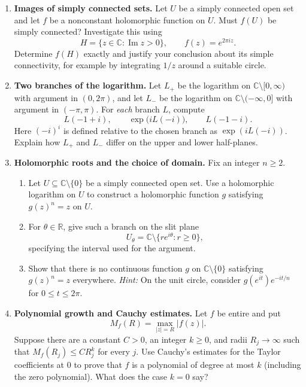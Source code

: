 \documentclass[12pt,reqno]{amsart}
\newcommand{\C}{\mathbb{C}}
\newcommand{\R}{\mathbb{R}}
\begin{document}
\begin{enumerate}
\item \textbf{Images of simply connected sets.}
Let $U$ be a simply connected open set and let $f$ be a nonconstant
holomorphic function on $U$. Must $f(U)$ be simply connected?
Investigate this using
\[
 H=\{z\in\C:\operatorname{Im}z>0\},\qquad f(z)=e^{2\pi i z}.
\]
Determine $f(H)$ exactly and justify your conclusion about its simple
connectivity, for example by integrating $1/z$ around a suitable circle.

\item \textbf{Two branches of the logarithm.}
Let $L_+$ be the logarithm on $\C\setminus[0,\infty)$ with argument
in $(0,2\pi)$, and let $L_-$ be the logarithm on
$\C\setminus(-\infty,0]$ with argument in $(-\pi,\pi)$.
For \emph{each} branch $L$, compute
\[
 L(-1+i),\qquad \exp\bigl(iL(-i)\bigr),\qquad L(-1-i).
\]
Here $(-i)^i$ is defined relative to the chosen branch as
$\exp(iL(-i))$. Explain how $L_+$ and $L_-$ differ on the upper and
lower half-planes.

\item \textbf{Holomorphic roots and the choice of domain.}
Fix an integer $n\geq2$.
\begin{enumerate}
\item Let $U\subseteq\C\setminus\{0\}$ be a simply connected open
set. Use a holomorphic logarithm on $U$ to construct a holomorphic
function $g$ satisfying $g(z)^n=z$ on $U$.
\item For $\theta\in\R$, give such a branch on the slit plane
\[
 U_\theta=\C\setminus\{re^{i\theta}:r\geq0\},
\]
specifying the interval used for the argument.
\item Show that there is no continuous function $g$ on
$\C\setminus\{0\}$ satisfying $g(z)^n=z$ everywhere.
\emph{Hint:} On the unit circle, consider
$g(e^{it})e^{-it/n}$ for $0\leq t\leq2\pi$.
\end{enumerate}

\item \textbf{Polynomial growth and Cauchy estimates.}
Let $f$ be entire and put
\[
 M_f(R)=\max_{|z|=R}|f(z)|.
\]
Suppose there are a constant $C>0$, an integer $k\geq0$, and radii
$R_j\to\infty$ such that $M_f(R_j)\leq C R_j^k$ for every $j$.
Use Cauchy's estimates for the Taylor coefficients at $0$ to prove
that $f$ is a polynomial of degree at most $k$ (including the zero
polynomial). What does the case $k=0$ say?

\end{enumerate}
\end{document}
